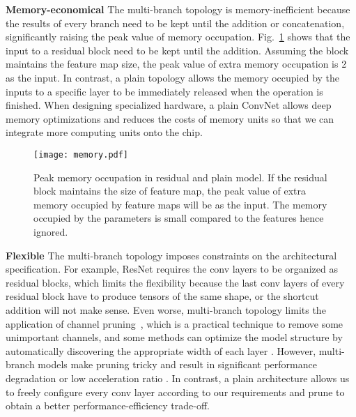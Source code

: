 \documentclass[final]{cvpr}
\begin{document}
\textbf{Memory-economical} \quad The multi-branch topology is memory-inefficient because the results of every branch need to be kept until the addition or concatenation, significantly raising the peak value of memory occupation. Fig.~\ref{fig-memory} shows that the input to a residual block need to be kept until the addition. Assuming the block maintains the feature map size, the peak value of extra memory occupation is 2 as the input. In contrast, a plain topology allows the memory occupied by the inputs to a specific layer to be immediately released when the operation is finished. When designing specialized hardware, a plain ConvNet allows deep memory optimizations and reduces the costs of memory units so that we can integrate more computing units onto the chip.
\begin{figure}
	\begin{center}
		\texttt{[image: memory.pdf]}
		\vspace{-0.25in}
		\caption{Peak memory occupation in residual and plain model. If the residual block maintains the size of feature map, the peak value of extra memory occupied by feature maps will be  as the input. The memory occupied by the parameters is small compared to the features hence ignored.}
		\label{fig-memory}
	\end{center}
	\vspace{-0.2in}
\end{figure}


\textbf{Flexible} \quad The multi-branch topology imposes constraints on the architectural specification. For example, ResNet requires the conv layers to be organized as residual blocks, which limits the flexibility because the last conv layers of every residual block have to produce tensors of the same shape, or the shortcut addition will not make sense. Even worse, multi-branch topology limits the application of channel pruning~\cite{li2016pruning,he2017channel}, which is a practical technique to remove some unimportant channels, and some methods can optimize the model structure by automatically discovering the appropriate width of each layer \cite{ding2019approximated}. However, multi-branch models make pruning tricky and result in significant performance degradation or low acceleration ratio \cite{ding2019centripetal,li2016pruning,ding2018auto}. In contrast, a plain architecture allows us to freely configure every conv layer according to our requirements and prune to obtain a better performance-efficiency trade-off.
\end{document}
